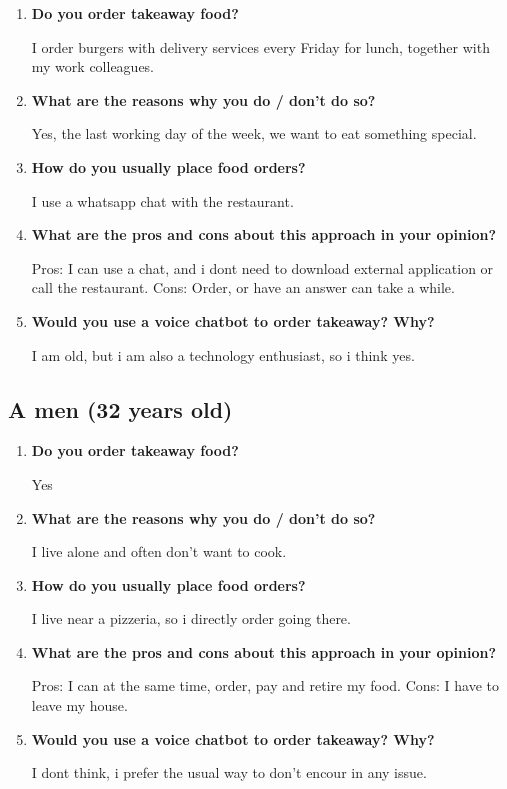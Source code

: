 \begin{enumerate}

\item \textbf{Do you order takeaway food?}

I order burgers with delivery services every Friday for lunch, together with my work colleagues.

\item \textbf{What are the reasons why you do / don't do so?}

Yes, the last working day of the week, we want to eat something special.

\item \textbf{How do you usually place food orders?}

I use a whatsapp chat with the restaurant.

\item \textbf{What are the pros and cons about this approach in your opinion?}

Pros: I can use a chat, and i dont need to download external application or call the restaurant.
Cons: Order, or have an answer can take a while.

\item \textbf{Would you use a voice chatbot to order takeaway? Why?}

I am old, but i am also a technology enthusiast, so i think yes.

\end{enumerate}



\subsection*{A men (32 years old)}

\begin{enumerate}

\item \textbf{Do you order takeaway food?}

Yes

\item \textbf{What are the reasons why you do / don't do so?}

I live alone and often don't want to cook.

\item \textbf{How do you usually place food orders?}

I live near a pizzeria, so i directly order going there.

\item \textbf{What are the pros and cons about this approach in your opinion?}

Pros: I can at the same time, order, pay and retire my food.
Cons: I have to leave my house.

\item \textbf{Would you use a voice chatbot to order takeaway? Why?}

I dont think, i prefer the usual way to don't encour in any issue.

\end{enumerate}